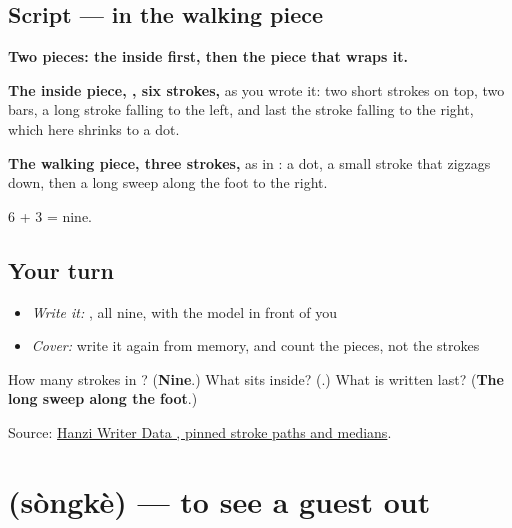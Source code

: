 \subsection*{Script —  in the walking piece}

\begin{quote}
\end{quote}

\textbf{Two pieces: the inside first, then the piece that wraps it.}

\textbf{The inside piece, , six strokes,} as you wrote it: two short strokes on top, two bars, a long stroke falling to the left, and last the stroke falling to the right, which here shrinks to a dot.

\textbf{The walking piece, three strokes,} as in : a dot, a small stroke that zigzags down, then a long sweep along the foot to the right.

6 + 3 = nine.

\subsection*{Your turn}
\begin{itemize}
\raggedright
  \item \emph{Write it:} , all nine, with the model in front of you
  \item \emph{Cover:} write it again from memory, and count the pieces, not the strokes
\end{itemize}

\begin{tcolorbox}[breakable,colback=teal!4,colframe=teal!35!black,title={Before you move on}]
How many strokes in ? (\textbf{Nine}.) What sits inside? (\textbf{}.) What is written last? (\textbf{The long sweep along the foot}.)

Source: \href{https://raw.githubusercontent.com/chanind/hanzi-writer-data/68d10a4b21150cae5e1ebbd223eed289cf32d90c/data/\%E9\%80\%81.json}{Hanzi Writer Data , pinned stroke paths and medians}.
\end{tcolorbox}
\section[\texorpdfstring{\zh{送客} (sòngkè)}{送客 (sòngkè)}]{ (sòngkè) — to see a guest out}

\label{lesson:ZH-C336-songke}



